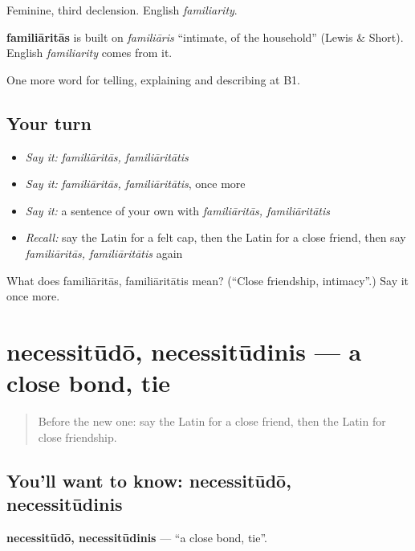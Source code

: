 Feminine, third declension. English \emph{familiarity}.

\begin{cousinweb}
\textbf{familiāritās} is built on \emph{familiāris} \textquotedblleft{}intimate, of the household\textquotedblright{} (Lewis \& Short). English \emph{familiarity} comes from it.
\end{cousinweb}

\begin{grammarlens}[title={What you've built}]
One more word for telling, explaining and describing at B1.
\end{grammarlens}

\subsection*{Your turn}
\begin{itemize}
\raggedright
  \item \emph{Say it:} \emph{familiāritās, familiāritātis}
  \item \emph{Say it:} \emph{familiāritās, familiāritātis}, once more
  \item \emph{Say it:} a sentence of your own with \emph{familiāritās, familiāritātis}
  \item \emph{Recall:} say the Latin for a felt cap, then the Latin for a close friend, then say \emph{familiāritās, familiāritātis} again
\end{itemize}

\begin{tcolorbox}[breakable,colback=teal!4,colframe=teal!35!black,title={Before you move on}]
What does familiāritās, familiāritātis mean? (\textquotedblleft{}Close friendship, intimacy\textquotedblright{}.) Say it once more.
\end{tcolorbox}
\section[necessitūdō, necessitūdinis]{necessitūdō, necessitūdinis — a close bond, tie}

\label{lesson:LA-C533-necessitudo}



\begin{quote}
Before the new one: say the Latin for a close friend, then the Latin for close friendship.
\end{quote}

\subsection*{You'll want to know: necessitūdō, necessitūdinis}
\textbf{necessitūdō, necessitūdinis} — \textquotedblleft{}a close bond, tie\textquotedblright{}.

